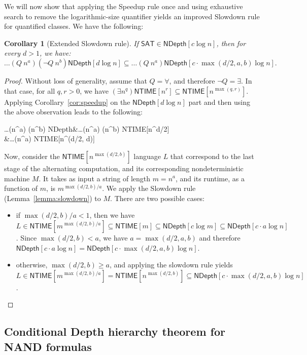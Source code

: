 \documentclass[a4paper, 11pt]{article}
\theoremstyle{plain}
\newtheorem{corollary}[theorem]{Corollary}
\theoremstyle{definition}
\theoremstyle{remark}
\newcommand{\NTIME}{\textsf{NTIME}}%
\newcommand{\SAT}{\textsf{SAT}}%
\newcommand{\ND}{\textsf{NDepth}}%
\newcommand{\NDL}[1]{\ND\left[ #1 \log n\right]}%
\begin{document}
We will now show that applying the Speedup rule once and
using exhaustive search to remove the logarithmic-size quantifier
yields an improved Slowdown rule for quantified classes.
We have the following:
\begin{corollary}[Extended Slowdown rule]\label{cor:extended_slowdown}
	If $\SAT{}\in \NDL{c}$, then for every $d > 1$, we have:
	\[\ldots (Q~n^{a}) (\neg Q~n^b) \NDL{d}
	\subseteq \ldots (Q~n^{a}) \NDL{c\cdot\max(d/2, a, b)}.\]
\end{corollary}
\begin{proof}
	Without loss of generality, assume that $Q = \forall$, and therefore $\neg Q = \exists$.
	In that case, for all $q, r > 0$, we have $(\exists n^q) \NTIME[n^r] \subseteq \NTIME[n^{\max(q,r)}] $.
	Applying Corollary~\ref{cor:speedup} on the $\NDL{d}$ part and then using the 
	above observation leads to the following:
	\begin{flalign*}
	\ldots (\forall n^{a}) (\exists n^b) \NDL{d} 
		&\subseteq \ldots (\forall n^{a}) (\exists n^b) \NTIME[n^{d/2}]\\	
		&\subseteq \ldots (\forall n^{a}) \NTIME[n^{\max(d/2, d)}]	
	\end{flalign*}

	Now, consider the $\NTIME[n^{\max(d/2, b)}]$ language $L$
	that correspond to the last stage of the alternating 
	computation, and its corresponding nondeterministic machine $M$. 
	It takes as input a string of length $m = n^{a}$, and its runtime, as a function of $m$, 
	is $m^{\max(d/2, b)/a}$.
	We apply the Slowdown rule (Lemma~\ref{lemma:slowdown}) to $M$. There are two possible cases:
	\begin{itemize}
		\item if $\max(d/2, b)/a < 1$, then we have 
		$L \in \NTIME[m^{\max(d/2, b)/a}] \subseteq \NTIME[m]
		\subseteq \ND[c \log m] \subseteq \NDL{c \cdot a}$.
		Since  $\max(d/2, b) < a$, we have $a = \max(d/2, a, b)$ and therefore 
		$\NDL{c \cdot a} = \NDL{c\cdot\max(d/2, a, b)}$.
		\item otherwise, $\max(d/2, b) \ge a$, and applying the slowdown rule yields
		$L \in \NTIME[m^{\max(d/2, b)/a}] =  \NTIME[n^{\max(d/2, b)}] \subseteq \NDL{c \cdot \max(d/2, a, b)}$.
	\end{itemize}
\end{proof}

\subsection{Conditional Depth hierarchy theorem for \textsf{NAND} formulas}
\end{document}
